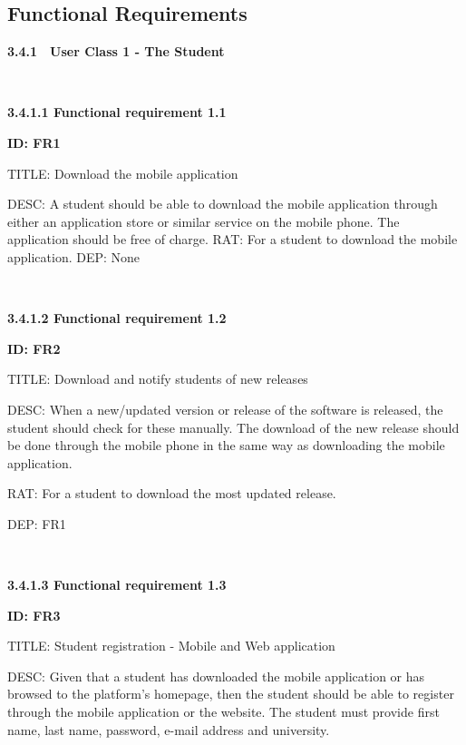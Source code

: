 \documentclass[12pt,a4paper]{article}
\begin{document}
    \newpage


    \subsection{Functional Requirements}

    \begin{flushleft}

        \textbf{3.4.1}\ \ \textbf{User Class 1 - The Student}

        \

        \textbf{3.4.1.1 Functional requirement 1.1}

        \textbf{ID: FR1}

        TITLE: Download the mobile application

        DESC: A student should be able to download the mobile application
        through either an application store or similar service on the mobile
        phone. The application should be free of charge.
        RAT: For a student to download the mobile application.
        DEP: None

        \


        \textbf{3.4.1.2 Functional requirement 1.2}

        \textbf{ID: FR2}

        TITLE: Download and notify students of new releases

        DESC: When a new/updated version or release of the software is released,
        the student should check for these manually. The download of the new
        release should be done through the mobile phone in the same way as
        downloading the mobile application.

        RAT: For a student to download the most updated release.

        DEP: FR1

        \

        \textbf{3.4.1.3 Functional requirement 1.3}

        \textbf{ID: FR3}

        TITLE: Student registration - Mobile and Web application

        DESC: Given that a student has downloaded the mobile application or has
        browsed to the platform's homepage, then the student should be able to
        register through the mobile application or the website. The student must
        provide first name, last name, password, e-mail address and university.


\end{flushleft}
\end{document}
